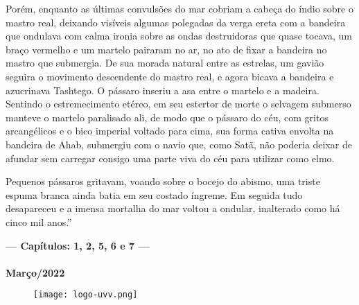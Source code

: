 \documentclass[12pt, addpoints]{exam}
\begin{document}
\begin{coverpages}
{Porém, enquanto as últimas convulsões do mar cobriam a cabeça do índio sobre o
mastro real, deixando visíveis algumas polegadas da verga ereta com a bandeira
que ondulava com calma ironia sobre as ondas destruidoras que quase tocava, um
braço vermelho e um martelo pairaram no ar, no ato de fixar a bandeira no mastro
que submergia. De sua morada natural entre as estrelas, um gavião seguira o
movimento descendente do mastro real, e agora bicava a bandeira e azucrinava
Tashtego. O pássaro inseriu a asa entre o martelo e a madeira. Sentindo o
estremecimento etéreo, em seu estertor de morte o selvagem submerso manteve o
martelo paralisado ali, de modo que o pássaro do céu, com gritos arcangélicos e
o bico imperial voltado para cima, sua forma cativa envolta na bandeira de Ahab,
submergiu com o navio que, como Satã, não poderia deixar de afundar sem carregar
consigo uma parte viva do céu para utilizar como elmo.

Pequenos pássaros gritavam, voando sobre o bocejo do abismo, uma triste espuma
branca ainda batia em seu costado íngreme. Em seguida tudo desapareceu e a
imensa mortalha do mar voltou a ondular, inalterado como há cinco mil anos.''}

\begin{center}
\textbf{\Large%
--- Capítulos: 1, 2, 5, 6 e 7 ---\\
\ \\
Março/2022}
\end{center}

\end{coverpages}

\newpage

\begin{figure}[H]
\begin{center}
\texttt{[image: logo-uvv.png]}
\end{center}	
\end{figure}

\vspace{-1cm}
\end{document}
